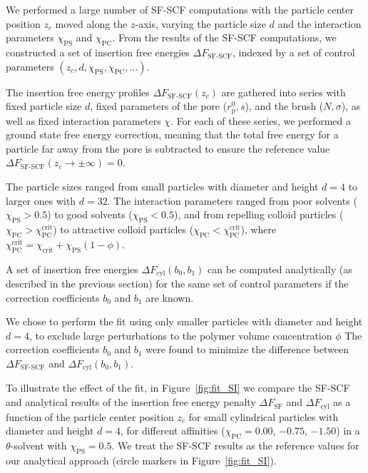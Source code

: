 \documentclass[10pt, a4paper]{article}
\begin{document}
\begin{multicols}{2}
We performed a large number of SF-SCF computations with the particle center position $z_c$ moved along the $z$-axis, varying the particle size $d$ and the interaction parameters $\chi_{\text{PS}}$ and $\chi_{\text{PC}}$.
From the results of the SF-SCF computations, we constructed a set of insertion free energies $\Delta F_{\text{SF-SCF}}$, indexed by a set of control parameters $(z_c, d, \chi_{\text{PS}}, \chi_{\text{PC}}, \dots)$.

The insertion free energy profiles $\Delta F_{\text{SF-SCF}}(z_c)$ are gathered into series with fixed particle size $d$, fixed parameters of the pore ($r_{\text{p}}^{0}, s$), and the brush ($N, \sigma$), as well as fixed interaction parameters $\chi$.
For each of these series, we performed a ground state free energy correction, meaning that the total free energy for a particle far away from the pore is subtracted to ensure the reference value $\Delta F_{\text{SF-SCF}}(z_c \to \pm \infty) = 0$.

The particle sizes ranged from small particles with diameter and height $d = 4$ to larger ones with $d = 32$.
The interaction parameters ranged from poor solvents ($\chi_{\text{PS}} > 0.5$) to good solvents ($\chi_{\text{PS}} < 0.5$), and from repelling colloid particles ($\chi_{\text{PC}} > \chi_{\text{PC}}^{\text{crit}}$) to attractive colloid particles ($\chi_{\text{PC}} < \chi_{\text{PC}}^{\text{crit}}$), where $\chi_{\text{PC}}^{\text{crit}} = \chi_{\text{crit}} + \chi_{\text{PS}} (1 - \phi)$.

A set of insertion free energies $\Delta F_{\text{cyl}}(b_0, b_1)$ can be computed analytically (as described in the previous section) for the same set of control parameters if the correction coefficients $b_0$ and $b_1$ are known.

We chose to perform the fit using only smaller particles with diameter and height $d = 4$, to exclude large perturbations to the polymer volume concentration $\phi$
The correction coefficients $b_0$ and $b_1$ were found to minimize the difference between $\Delta F_{\text{SF-SCF}}$ and $\Delta F_{\text{cyl}}(b_0, b_1)$.

To illustrate the effect of the fit, in Figure~\ref{fig:fit_SI} we compare the SF-SCF and analytical results of the insertion free energy penalty $\Delta F_{\text{SF}}$ and $\Delta F_{\text{cyl}}$ as a function of the particle center position $z_c$ for small cylindrical particles with diameter and height $d = 4$, for different affinities ($\chi_{\text{PC}} = 0.00$, $-0.75$, $-1.50$) in a $\theta$-solvent with $\chi_{\text{PS}} = 0.5$.
We treat the SF-SCF results as the reference values for our analytical approach (circle markers in Figure~\ref{fig:fit_SI}).


\end{multicols}
\end{document}
